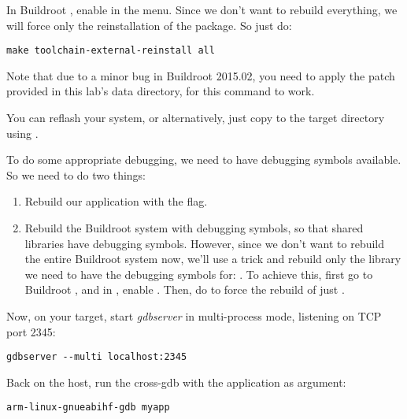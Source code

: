 In Buildroot , enable
 in the 
menu. Since we don't want to rebuild everything, we will force only
the reinstallation of the  package. So just
do:

\begin{verbatim}
make toolchain-external-reinstall all
\end{verbatim}

Note that due to a minor bug in Buildroot 2015.02, you need to apply
the patch
provided in this lab's data directory, for this
 command to work.

You can reflash your system, or alternatively, just copy
 to the target 
directory using .

To do some appropriate debugging, we need to have debugging symbols
available. So we need to do two things:

\begin{enumerate}

\item Rebuild our application with the  flag.

\item Rebuild the Buildroot system with debugging symbols, so that
  shared libraries have debugging symbols. However, since we don't
  want to rebuild the entire Buildroot system now, we'll use a trick
  and rebuild only the library we need to have the debugging symbols
  for: . To achieve this, first go to Buildroot
  , and in , enable
  . Then, do  to force the rebuild of just
  .

\end{enumerate}

Now, on your target, start {\em gdbserver} in multi-process mode,
listening on TCP port 2345:

\begin{verbatim}
gdbserver --multi localhost:2345
\end{verbatim}

Back on the host, run the cross-gdb with the  application
as argument:

\begin{verbatim}
arm-linux-gnueabihf-gdb myapp
\end{verbatim}


